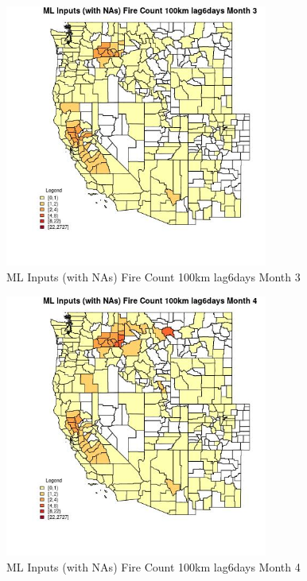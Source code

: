 \begin{figure} 
\centering  
\includegraphics[width=0.77\textwidth]{Code_Outputs/Report_ML_input_PM25_Step4_part_f_de_duplicated_aveswNAs_CountyFire_Count_100km_lag6daysmedianMonth3.jpg} 
\caption{\label{fig:Report_ML_input_PM25_Step4_part_f_de_duplicated_aveswNAsCountyFire_Count_100km_lag6daysmedianMonth3}ML Inputs (with NAs) Fire Count 100km lag6days Month 3} 
\end{figure} 
 

\begin{figure} 
\centering  
\includegraphics[width=0.77\textwidth]{Code_Outputs/Report_ML_input_PM25_Step4_part_f_de_duplicated_aveswNAs_CountyFire_Count_100km_lag6daysmedianMonth4.jpg} 
\caption{\label{fig:Report_ML_input_PM25_Step4_part_f_de_duplicated_aveswNAsCountyFire_Count_100km_lag6daysmedianMonth4}ML Inputs (with NAs) Fire Count 100km lag6days Month 4} 
\end{figure} 
 


